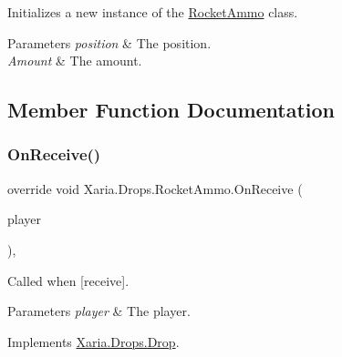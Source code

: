 Initializes a new instance of the \hyperlink{classXaria_1_1Drops_1_1RocketAmmo}{Rocket\+Ammo} class. 


\begin{DoxyParams}{Parameters}
{\em position} & The position.\\
\hline
{\em Amount} & The amount.\\
\hline
\end{DoxyParams}


\subsection{Member Function Documentation}
\mbox{\label{classXaria_1_1Drops_1_1RocketAmmo_a5a860b6a2c037fa5f24416cf9296055d}} 
\subsubsection{\texorpdfstring{On\+Receive()}{OnReceive()}}
{\footnotesize\ttfamily override void Xaria.\+Drops.\+Rocket\+Ammo.\+On\+Receive (\begin{DoxyParamCaption}\item[{ref \hyperlink{classXaria_1_1Player}{Player}}]{player }\end{DoxyParamCaption})\hspace{0.3cm}{\ttfamily [inline]}, {\ttfamily [virtual]}}



Called when \mbox{[}receive\mbox{]}. 


\begin{DoxyParams}{Parameters}
{\em player} & The player.\\
\hline
\end{DoxyParams}


Implements \hyperlink{classXaria_1_1Drops_1_1Drop_abb5544bb56ff889f557888bd9e86f7cb}{Xaria.\+Drops.\+Drop}.

\mbox{\label{classXaria_1_1Drops_1_1RocketAmmo_aafefb9dee3587e29c16eaa07b45228ad}} 
